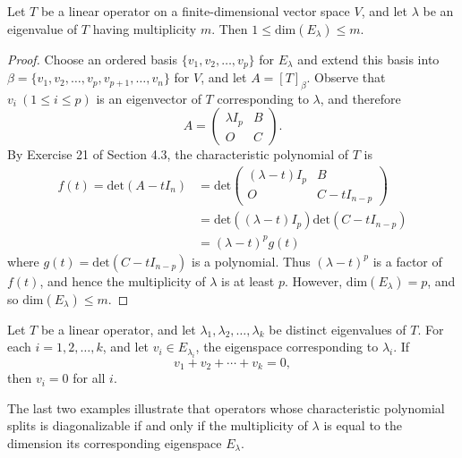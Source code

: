 \begin{theorem}
    Let \( T  \) be a linear operator on a finite-dimensional vector space \( V  \), and let \( \lambda  \) be an eigenvalue of \( T  \) having multiplicity \(  m  \). Then \( 1 \leq \text{dim}({E}_{\lambda}) \leq  m \).
\end{theorem} 
\begin{proof}
    Choose an ordered basis \( \{ {v}_{1}, {v}_{2}, \dots, {v}_{p} \}   \) for \( {E}_{\lambda} \) and extend this basis into \( \beta = \{ {v}_{1}, {v}_{2}, \dots ,{v}_{p}, {v}_{p+1}, \dots, {v}_{n} \}   \) for \( V  \), and let \( A = [T]_{\beta} \). Observe that \( {v}_{i} \ (1 \leq i \leq p ) \) is an eigenvector of \( T  \) corresponding to \( \lambda  \), and therefore 
    \[  A = \begin{pmatrix} 
        \lambda {I}_{p} & B \\
        O & C 
              \end{pmatrix}.   \]
By Exercise 21 of Section 4.3, the characteristic polynomial of \( T  \) is
\begin{align*}
    f(t) = \text{det}(A - t {I}_{n}) &= \text{det}\begin{pmatrix} 
        (\lambda - t){I}_{p} & B  \\
        O & C - t {I}_{n-p}
              \end{pmatrix}  \\
              &= \text{det}((\lambda -t){I}_{p}) \text{det}(C - {tI}_{n-p}) \\
              &= (\lambda - t)^{p} g(t)
\end{align*}
where \( g(t) = \text{det}(C - {tI}_{n-p}) \) is a polynomial. Thus \( (\lambda - t)^{p} \) is a factor of \( f(t)  \), and hence the multiplicity of \( \lambda  \) is at least \( p  \). However, \( \text{dim}({E}_{\lambda}) = p  \), and so \( \text{dim}({E}_{\lambda}) \leq m \).
\end{proof}

\begin{lemma}
    Let \( T  \) be a linear operator, and let \( {\lambda}_{1}, {\lambda}_{2}, \dots, {\lambda}_{k} \) be distinct eigenvalues of \( T  \). For each \( i = 1,2,\dots,k  \), and let \( {v}_{i} \in {E}_{{\lambda}_{i}}  \), the eigenspace corresponding to \( {\lambda}_{i} \). If
    \[  {v}_{1} + {v}_{2} + \cdots + {v}_{k} = 0, \]
    then \( {v}_{i} = 0  \) for all \( i \).
\end{lemma}

The last two examples illustrate that operators whose characteristic polynomial splits is diagonalizable if and only if the multiplicity of \( \lambda \) is equal to the dimension its corresponding eigenspace \( {E}_{\lambda} \).

